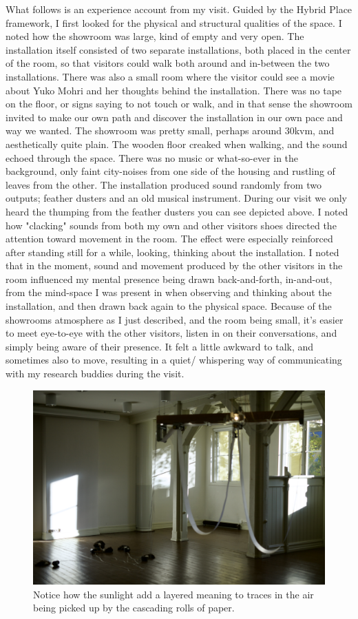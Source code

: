 What follows is an experience account from my visit. Guided by the Hybrid Place framework, I first looked for the physical and structural qualities of the space. I noted how the showroom was large, kind of empty and very open. The installation itself consisted of two separate installations, both placed in the center of the room, so that visitors could walk both around and in-between the two installations. There was also a small room where the visitor could see a movie about Yuko Mohri and her thoughts behind the installation. There was no tape on the floor, or signs saying to not touch or walk, and in that sense the showroom invited to make our own path and discover the installation in our own pace and way we wanted. The showroom was pretty small, perhaps around 30kvm, and aesthetically quite plain. The wooden floor creaked when walking, and the sound echoed through the space. There was no music or what-so-ever in the background, only faint city-noises from one side of the housing and rustling of leaves from the other. The installation produced sound randomly from two outputs; feather dusters and an old musical instrument. During our visit we only heard the thumping from the feather dusters you can see depicted above. I noted how "clacking" sounds from both my own and other visitors shoes directed the attention toward movement in the room. The effect were especially reinforced after standing still for a while, looking, thinking about the installation. I noted that in the moment, sound and movement produced by the other visitors in the room influenced my mental presence being drawn back-and-forth, in-and-out, from the mind-space I was present in when observing and thinking about the installation, and then drawn back again to the physical space. Because of the showrooms atmosphere as I just described, and the room being small, it's easier to meet eye-to-eye with the other visitors, listen in on their conversations, and simply being aware of their presence. It felt a little awkward to talk, and sometimes also to move, resulting in a quiet/ whispering way of communicating with my research buddies during the visit.

\begin{figure}[h]
    \includegraphics[width=12cm]{pictures/process/yuko_harmony.jpeg}
    \centering 
    \caption{Notice how the sunlight add a layered meaning to traces in the air being picked up by the cascading rolls of paper.}
\end{figure}

